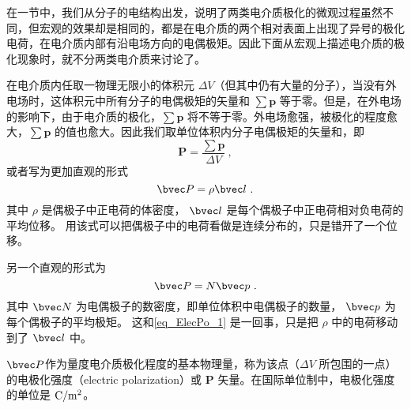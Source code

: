
\begin{issues}
\end{issues}


在一节中，我们从分子的电结构出发，说明了两类电介质极化的微观过程虽然不同，但宏观的效果却是相同的，都是在电介质的两个相对表面上出现了异号的极化电荷，在电介质内部有沿电场方向的电偶极矩。因此下面从宏观上描述电介质的极化现象时，就不分两类电介质来讨论了。

在电介质内任取一物理无限小的体积元 $\Delta V$（但其中仍有大量的分子），当没有外电场时，这体积元中所有分子的电偶极矩的矢量和 $\sum \mathbf p$ 等于零。但是，在外电场的影响下，由于电介质的极化，$\sum \mathbf p$ 将不等于零。外电场愈强，被极化的程度愈大，$\sum \mathbf p$ 的值也愈大。因此我们取单位体积内分子电偶极矩的矢量和，即
\begin{equation}
\mathbf P=\frac{\sum \mathbf p}{\Delta V} ~,
\end{equation}
或者写为更加直观的形式
\begin{equation}\label{eq_ElecPo_1}
\bvec P = \rho \bvec l~.
\end{equation}
其中 $\rho$ 是偶极子中正电荷的体密度， $\bvec l$ 是每个偶极子中正电荷相对负电荷的平均位移。 用该式可以把偶极子中的电荷看做是连续分布的，只是错开了一个位移。

另一个直观的形式为
\begin{equation}
\bvec P = N \bvec p~.
\end{equation}
其中 $\bvec N$ 为电偶极子的数密度，即单位体积中电偶极子的数量， $\bvec p$ 为每个偶极子的平均极矩。 这和\autoref{eq_ElecPo_1} 是一回事，只是把 $\rho$ 中的电荷移动到了 $\bvec l$ 中。

$\bvec P$作为量度电介质极化程度的基本物理量，称为该点（$\Delta V$ 所包围的一点）的电极化强度（electric polarization）或 $\mathbf P$ 矢量。在国际单位制中，电极化强度的单位是 $\rm C/m^2$。
